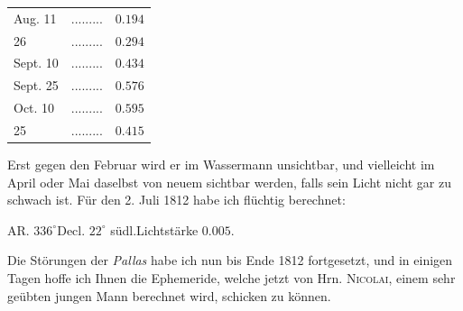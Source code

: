 \begin{center}\fontsize{10}{12}\selectfont\setlength{\tabcolsep}{4pt}\renewcommand{\arraystretch}{1.15}\begin{tabular}{llr}
Aug. 11 & .\;.\;.\;.\;.\;.\;.\;.\;. & $0.194$\\
26 & .\;.\;.\;.\;.\;.\;.\;.\;. & $0.294$\\
Sept. 10 & .\;.\;.\;.\;.\;.\;.\;.\;. & $0.434$\\
Sept. 25 & .\;.\;.\;.\;.\;.\;.\;.\;. & $0.576$\\
Oct. 10 & .\;.\;.\;.\;.\;.\;.\;.\;. & $0.595$\\
25 & .\;.\;.\;.\;.\;.\;.\;.\;. & $0.415$\\
\end{tabular}\end{center}

\noindent Erst gegen den Februar wird er im Wassermann unsichtbar, und vielleicht im April oder Mai daselbst von neuem sichtbar werden, falls sein Licht nicht gar zu schwach ist. Für den 2. Juli 1812 habe ich flüchtig berechnet:
\begin{center}AR. $336^\circ$\quad Decl. $22^\circ$ südl.\quad Lichtstärke $0.005$.\end{center}
\par{}

\par\indent Die Störungen der \emph{Pallas} habe ich nun bis Ende 1812 fortgesetzt, und in einigen Tagen hoffe ich Ihnen die Ephemeride, welche jetzt von Hrn. \textsc{Nicolai}, einem sehr geübten jungen Mann berechnet wird, schicken zu können.

